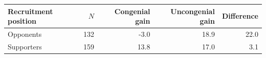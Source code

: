 \begin{tabular}{lrrrr}
\toprule
Recruitment position & $N$ & Congenial gain & Uncongenial gain & Difference \\
\midrule
Opponents & 132 & -3.0 & 18.9 & 22.0 \\
Supporters & 159 & 13.8 & 17.0 & 3.1 \\
\bottomrule
\end{tabular}
